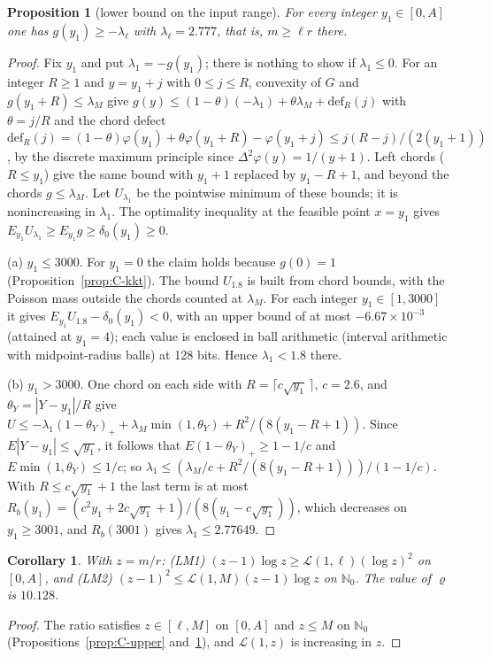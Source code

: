 \documentclass[10pt,letterpaper]{article}
\newtheorem{proposition}[theorem]{Proposition}
\newtheorem{corollary}[theorem]{Corollary}
\begin{document}
\begin{proposition}[lower bound on the input range]\label{prop:C-lower}
For every integer $y_1\in[0,A]$ one has $g(y_1)\ge-\lambda_\ell$ with $\lambda_\ell=2.777$, that is, $m\ge\ell r$ there.
\end{proposition}
\begin{proof}
Fix $y_1$ and put $\lambda_1=-g(y_1)$; there is nothing to show if $\lambda_1\le0$. For an integer $R\ge1$ and $y=y_1+j$ with $0\le j\le R$, convexity of $G$ and $g(y_1+R)\le\lambda_M$ give $g(y)\le(1-\theta)(-\lambda_1)+\theta\lambda_M+\mathrm{def}_R(j)$ with $\theta=j/R$ and the
chord defect $\mathrm{def}_R(j)=(1-\theta)\varphi(y_1)+\theta\varphi(y_1+R)-\varphi(y_1+j)\le j(R-j)/(2(y_1+1))$, by the discrete maximum
principle since $\Delta^2\varphi(y)=1/(y+1)$. Left chords ($R\le y_1$) give the same bound with $y_1+1$ replaced by $y_1-R+1$, and beyond
the chords $g\le\lambda_M$. Let $U_{\lambda_1}$ be the pointwise minimum of these bounds; it is nonincreasing in $\lambda_1$. The optimality
inequality at the feasible point $x=y_1$ gives $E_{y_1}U_{\lambda_1}\ge E_{y_1}g\ge\delta_0(y_1)\ge0$.

(a) $y_1\le3000$. For $y_1=0$ the claim holds because $g(0)=1$ (Proposition~\ref{prop:C-kkt}). The bound $U_{1.8}$ is built from chord bounds, with the Poisson mass outside the chords counted at
$\lambda_M$. For each integer $y_1\in[1,3000]$ it gives $E_{y_1}U_{1.8}-\delta_0(y_1)<0$, with an upper bound of at most $-6.67\times10^{-3}$
(attained at $y_1=4$); each value is enclosed in ball arithmetic (interval arithmetic with midpoint-radius balls) at 128 bits. Hence $\lambda_1<1.8$ there.

(b) $y_1>3000$. One chord on each side with $R=\lceil c\sqrt{y_1}\,\rceil$, $c=2.6$, and $\theta_Y=|Y-y_1|/R$ give
$U\le-\lambda_1(1-\theta_Y)_++\lambda_M\min(1,\theta_Y)+R^2/(8(y_1-R+1))$. Since $E|Y-y_1|\le\sqrt{y_1}$, it follows that $E(1-\theta_Y)_+\ge1-1/c$ and
$E\min(1,\theta_Y)\le1/c$; so $\lambda_1\le(\lambda_M/c+R^2/(8(y_1-R+1)))/(1-1/c)$. With $R\le c\sqrt{y_1}+1$ the last term is at most
$R_b(y_1)=(c^2y_1+2c\sqrt{y_1}+1)/(8(y_1-c\sqrt{y_1}))$, which decreases on $y_1\ge3001$, and $R_b(3001)$ gives $\lambda_1\le2.77649$.
\end{proof}

\begin{corollary}\label{cor:C-LM}
With $z=m/r$: (LM1) $(z-1)\log z\ge\mathcal L(1,\ell)(\log z)^2$ on $[0,A]$, and (LM2) $(z-1)^2\le\mathcal L(1,M)(z-1)\log z$ on
$\mathbb N_0$. The value of $\varrho$ is $10.128$.
\end{corollary}
\begin{proof}
The ratio satisfies $z\in[\ell,M]$ on $[0,A]$ and $z\le M$ on $\mathbb N_0$ (Propositions~\ref{prop:C-upper} and~\ref{prop:C-lower}), and
$\mathcal L(1,z)$ is increasing in $z$.
\end{proof}
\end{document}
